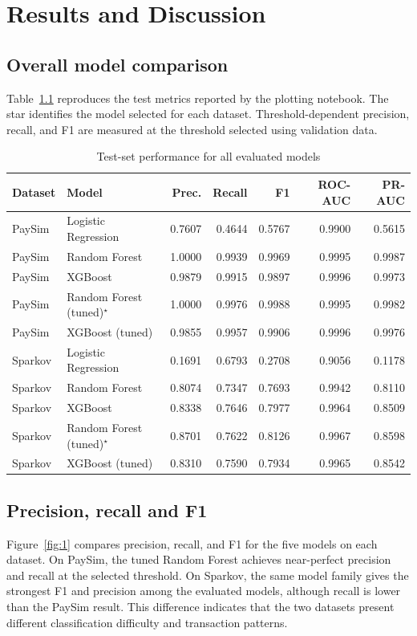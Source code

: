 \documentclass[12pt,a4paper]{report}
\begin{document}
\chapter{Results and Discussion}
\section{Overall model comparison}
Table~\ref{tab:results} reproduces the test metrics reported by the plotting notebook. The star identifies the model selected for each dataset. Threshold-dependent precision, recall, and F1 are measured at the threshold selected using validation data.

\begin{table}[H]
\centering
\caption{Test-set performance for all evaluated models}
\label{tab:results}
\small
\begin{tabular}{llrrrrr}
\toprule
\textbf{Dataset} & \textbf{Model} & \textbf{Prec.} & \textbf{Recall} & \textbf{F1} & \textbf{ROC-AUC} & \textbf{PR-AUC}\\
\midrule
PaySim & Logistic Regression & 0.7607 & 0.4644 & 0.5767 & 0.9900 & 0.5615\\
PaySim & Random Forest & 1.0000 & 0.9939 & 0.9969 & 0.9995 & 0.9987\\
PaySim & XGBoost & 0.9879 & 0.9915 & 0.9897 & 0.9996 & 0.9973\\
PaySim & Random Forest (tuned)$^\star$ & 1.0000 & 0.9976 & 0.9988 & 0.9995 & 0.9982\\
PaySim & XGBoost (tuned) & 0.9855 & 0.9957 & 0.9906 & 0.9996 & 0.9976\\
\midrule
Sparkov & Logistic Regression & 0.1691 & 0.6793 & 0.2708 & 0.9056 & 0.1178\\
Sparkov & Random Forest & 0.8074 & 0.7347 & 0.7693 & 0.9942 & 0.8110\\
Sparkov & XGBoost & 0.8338 & 0.7646 & 0.7977 & 0.9964 & 0.8509\\
Sparkov & Random Forest (tuned)$^\star$ & 0.8701 & 0.7622 & 0.8126 & 0.9967 & 0.8598\\
Sparkov & XGBoost (tuned) & 0.8310 & 0.7590 & 0.7934 & 0.9965 & 0.8542\\
\bottomrule
\end{tabular}
\end{table}

\section{Precision, recall and F1}
Figure~\ref{fig:1} compares precision, recall, and F1 for the five models on each dataset. On PaySim, the tuned Random Forest achieves near-perfect precision and recall at the selected threshold. On Sparkov, the same model family gives the strongest F1 and precision among the evaluated models, although recall is lower than the PaySim result. This difference indicates that the two datasets present different classification difficulty and transaction patterns.
\end{document}
